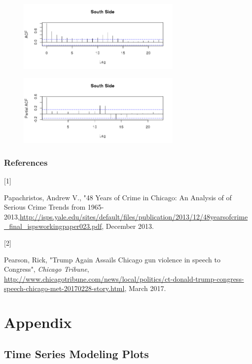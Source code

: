 \documentclass{article} %
\begin{document}
\begin{multicols}{2}
\begin{figure}[H]
\includegraphics[width=80mm]{Plots/south_ACF.png}
\end{figure}

\begin{figure}[H]
\includegraphics[width=80mm]{Plots/south_PACF.png}
\end{figure}
\end{multicols}




\newpage


\subsubsection*{References}


\hypertarget{Ref1}{[1]} Papachristos, Andrew V., "48 Years of Crime in Chicago: An Analysis of of Serious Crime Trends from 1965-2013,\url{http://isps.yale.edu/sites/default/files/publication/2013/12/48yearsofcrime_final_ispsworkingpaper023.pdf}, December 2013.

\hypertarget{Ref2}{[2]} Pearson, Rick, "Trump Again Assails Chicago gun violence in speech to Congress", \textit{Chicago Tribune}, \url{http://www.chicagotribune.com/news/local/politics/ct-donald-trump-congress-speech-chicago-met-20170228-story.html}, March 2017.


\clearpage
\newpage

\section{Appendix}
\label{headings}


\subsection{Time Series Modeling Plots}
\label{appendix_regression}
\end{document}
